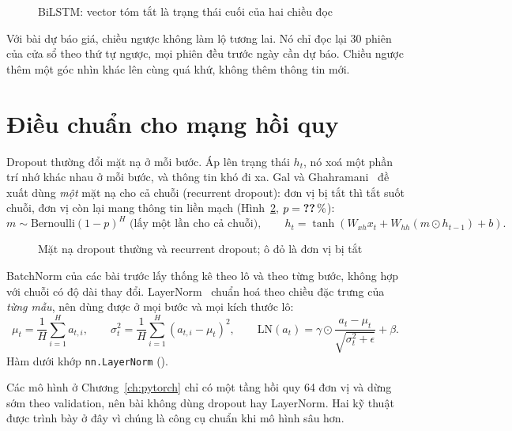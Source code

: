 \begin{figure}[H]
  \centering
  \caption{BiLSTM: vector tóm tắt là trạng thái cuối của hai chiều đọc}
  \label{fig:bilstm}
\end{figure}

Với bài dự báo giá, chiều ngược không làm lộ tương lai. Nó chỉ đọc lại 30 phiên của cửa sổ theo thứ tự ngược, mọi phiên
đều trước ngày cần dự báo. Chiều ngược thêm một góc nhìn khác lên cùng quá khứ, không thêm thông tin mới.

\section{Điều chuẩn cho mạng hồi quy}

Dropout thường đổi mặt nạ ở mỗi bước. Áp lên trạng thái $h_t$, nó xoá một phần trí nhớ khác nhau ở mỗi bước, và
thông tin khó đi xa. Gal và Ghahramani~\cite{gal2016} đề xuất dùng \emph{một} mặt nạ cho cả chuỗi (recurrent dropout):
đơn vị bị tắt thì tắt suốt chuỗi, đơn vị còn lại mang thông tin liền mạch (Hình~\ref{fig:dropout}, $p =
\SL{theory/mask_p}\,\%$):
\begin{equation}
  m \sim \mathrm{Bernoulli}(1-p)^H \text{ (lấy một lần cho cả chuỗi)}, \qquad
  h_t = \tanh\left(W_{xh} x_t + W_{hh} (m \odot h_{t-1}) + b\right).
  \label{eq:recdrop}
\end{equation}

\begin{figure}[H]
  \centering
  \caption{Mặt nạ dropout thường và recurrent dropout; ô đỏ là đơn vị bị tắt}
  \label{fig:dropout}
\end{figure}


BatchNorm của các bài trước lấy thống kê theo lô và theo từng bước, không hợp với chuỗi có độ dài thay đổi.
LayerNorm~\cite{ba2016} chuẩn hoá theo chiều đặc trưng của \emph{từng mẫu}, nên dùng được ở mọi bước và mọi kích thước lô:
\begin{equation}
  \mu_t = \frac{1}{H}\sum_{i=1}^{H} a_{t,i}, \qquad
  \sigma_t^2 = \frac{1}{H}\sum_{i=1}^{H} (a_{t,i} - \mu_t)^2, \qquad
  \mathrm{LN}(a_t) = \gamma \odot \frac{a_t - \mu_t}{\sqrt{\sigma_t^2 + \epsilon}} + \beta .
  \label{eq:ln}
\end{equation}
Hàm dưới khớp \texttt{nn.LayerNorm} ().


Các mô hình ở Chương~\ref{ch:pytorch} chỉ có một tầng hồi quy 64 đơn vị và dừng sớm theo validation, nên bài không
dùng dropout hay LayerNorm. Hai kỹ thuật được trình bày ở đây vì chúng là công cụ chuẩn khi mô hình sâu hơn.
